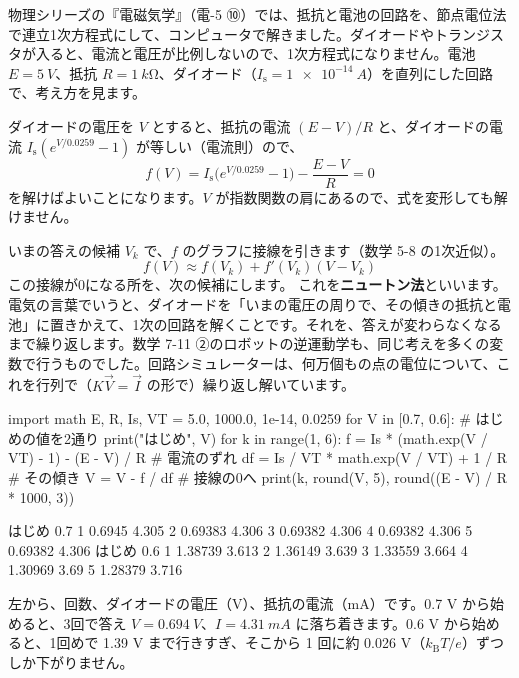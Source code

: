 \label{ph:原-10:sec12}
物理シリーズの『電磁気学』（電-5 ⑩）では、抵抗と電池の回路を、節点電位法で連立1次方程式にして、コンピュータで解きました。ダイオードやトランジスタが入ると、電流と電圧が比例しないので、1次方程式になりません。電池 $E=\qty{5}{V}$、抵抗 $R=\qty{1}{k\ohm}$、ダイオード（$I_{\mathrm s}=\qty{1e-14}{A}$）を直列にした回路で、考え方を見ます。

ダイオードの電圧を $V$ とすると、抵抗の電流 $(E-V)/R$ と、ダイオードの電流 $I_{\mathrm s}(e^{V/0.0259}-1)$ が等しい（電流則）ので、
\[ f(V)=I_{\mathrm s}\bigl(e^{V/0.0259}-1\bigr)-\frac{E-V}{R}=0 \]
を解けばよいことになります。$V$ が指数関数の肩にあるので、式を変形しても解けません。

いまの答えの候補 $V_k$ で、$f$ のグラフに接線を引きます（数学 5-8 の1次近似）。
\[ f(V)\approx f(V_k)+f'(V_k)(V-V_k) \]
この接線が0になる所を、次の候補にします。
\label{ph:原-10:newton}これを\textbf{ニュートン法}といいます。電気の言葉でいうと、ダイオードを「いまの電圧の周りで、その傾きの抵抗と電池」に置きかえて、1次の回路を解くことです。それを、答えが変わらなくなるまで繰り返します。数学 7-11 ②のロボットの逆運動学も、同じ考えを多くの変数で行うものでした。回路シミュレーターは、何万個もの点の電位について、これを行列で（$K\vec V=\vec I$ の形で）繰り返し解いています。

\begin{phcode}[Python]
import math
E, R, Is, VT = 5.0, 1000.0, 1e-14, 0.0259
for V in [0.7, 0.6]:                       \# はじめの値を2通り
    print("はじめ", V)
    for k in range(1, 6):
        f = Is * (math.exp(V / VT) - 1) - (E - V) / R      \# 電流のずれ
        df = Is / VT * math.exp(V / VT) + 1 / R            \# その傾き
        V = V - f / df                                     \# 接線の0へ
        print(k, round(V, 5), round((E - V) / R * 1000, 3))
\end{phcode}
\begin{phcodeout}[実行結果]
はじめ 0.7
1 0.6945 4.305
2 0.69383 4.306
3 0.69382 4.306
4 0.69382 4.306
5 0.69382 4.306
はじめ 0.6
1 1.38739 3.613
2 1.36149 3.639
3 1.33559 3.664
4 1.30969 3.69
5 1.28379 3.716
\end{phcodeout}
左から、回数、ダイオードの電圧（V）、抵抗の電流（mA）です。0.7 V から始めると、3回で答え $V=\qty{0.694}{V}$、$I=\qty{4.31}{mA}$ に落ち着きます。0.6 V から始めると、1回めで 1.39 V まで行きすぎ、そこから 1 回に約 0.026 V（$k_{\mathrm B}T/e$）ずつしか下がりません。

